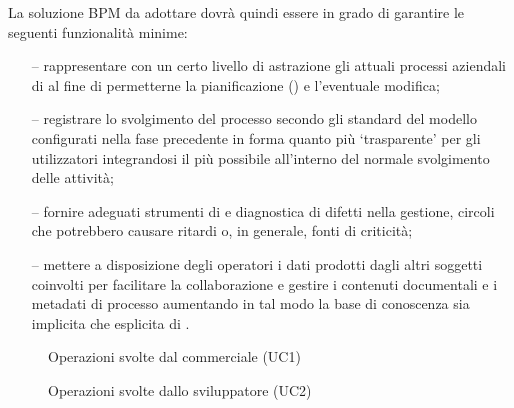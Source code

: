La soluzione BPM da adottare dovrà quindi essere in grado di garantire le seguenti funzionalità minime:
\begin{itemize}
  \item[--] rappresentare con un certo livello di astrazione gli attuali processi aziendali di \customer al fine di permetterne la pianificazione (\bsn {}) e l'eventuale modifica;
  \item[--] registrare lo svolgimento del processo secondo gli standard del modello configurati nella fase precedente in forma quanto più `trasparente' per gli utilizzatori integrandosi il più possibile all'interno del normale svolgimento delle attività;
  \item[--] fornire adeguati strumenti di  e diagnostica di difetti nella gestione, circoli che potrebbero causare ritardi o, in generale, fonti di criticità;
  \item[--] mettere a disposizione degli operatori i dati prodotti dagli altri soggetti coinvolti per facilitare la collaborazione e gestire i contenuti documentali e i metadati di processo aumentando in tal modo la base di conoscenza sia implicita che esplicita di \customer.
\end{itemize}

\begin{figure}[H]
  \centering
  
  \caption{Operazioni svolte dal commerciale (UC1)}
\end{figure}

\begin{figure}[H]
  \centering
  
  \caption{Operazioni svolte dallo sviluppatore (UC2)}
\end{figure}





